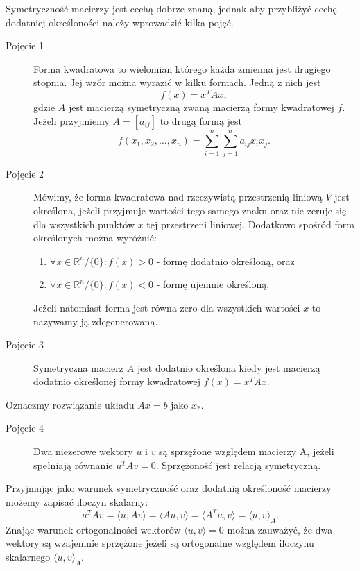 \documentclass[a4paper,12pt]{book} %
\begin{document}
Symetryczność macierzy jest cechą dobrze znaną, jednak aby przybliżyć cechę dodatniej określoności należy wprowadzić kilka pojęć.
\begin{description}
\item[Pojęcie 1] Forma kwadratowa\cite{quadratic-form} to wielomian którego każda zmienna jest drugiego stopnia. Jej wzór można wyrazić w kilku formach. Jedną z nich jest
$$f(x) = x^TAx,$$
gdzie $A$ jest macierzą symetryczną zwaną macierzą formy kwadratowej $f$. Jeżeli przyjmiemy $A = [a_{ij}]$ to drugą formą jest
$$f(x_1,x_2,\ldots,x_n) = \sum_{i=1}^n\sum_{j=1}^na_{ij}x_ix_j.$$

\item[Pojęcie 2] Mówimy, że forma kwadratowa nad rzeczywistą przestrzenią liniową $V$ jest określona, jeżeli przyjmuje wartości tego samego znaku oraz nie zeruje się dla wszystkich punktów $x$ tej przestrzeni liniowej. Dodatkowo spośród form określonych można wyróżnić:
\begin{enumerate}
\item $\forall x \in \mathbb{R}^n/\{0\}: f(x) > 0$ - formę dodatnio określoną, oraz
\item $\forall x \in \mathbb{R}^n/\{0\}: f(x) < 0$ - formę ujemnie określoną.  
\end{enumerate}
Jeżeli natomiast forma jest równa zero dla wszystkich wartości $x$ to nazywamy ją zdegenerowaną.

\item[Pojęcie 3] Symetryczna macierz $A$ jest dodatnio określona kiedy jest macierzą dodatnio określonej formy kwadratowej $f(x) = x^TAx$.
\end{description}

Oznaczmy rozwiązanie układu $Ax = b$ jako $x_*.$
\begin{description}
\item[Pojęcie 4] Dwa niezerowe wektory $u$ i $v$ są sprzężone względem macierzy A, jeżeli spełniają równanie $u^TAv = 0.$ Sprzężoność jest relacją symetryczną.
\end{description}
Przyjmując jako warunek symetryczność oraz dodatnią określoność macierzy możemy zapisać iloczyn skalarny:
$$u^TAv = \langle u,Av\rangle = \langle Au, v \rangle = \langle A^Tu, v \rangle = \langle u, v \rangle_A.$$
Znając warunek ortogonalności wektorów $\langle u, v\rangle = 0$ można zauważyć, że dwa wektory są wzajemnie sprzężone jeżeli są ortogonalne względem iloczynu skalarnego $\langle u, v \rangle_A.$
\end{document}
